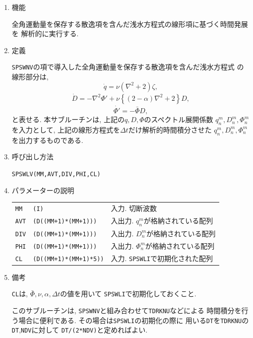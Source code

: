 \documentclass[a4j,fleqn]{jarticle}
\begin{document}
\begin{enumerate}

\item 機能

全角運動量を保存する散逸項を含んだ浅水方程式の線形項に基づく時間発展を
解析的に実行する.

\item 定義

{\tt SPSWNV}の項で導入した全角運動量を保存する散逸項を含んだ浅水方程式
の線形部分は,
\begin{equation}
\dot{q}=\nu(\nabla^2+2)\zeta,
\end{equation}
\begin{eqnarray}
\dot{D}=-\nabla^2\Phi'+\nu\left\{(2-\alpha)\nabla^2+2\right\}D,
\end{eqnarray}
\begin{equation}
\dot{\Phi'}=-\bar\Phi D,
\end{equation}
と表せる.
本サブルーチンは, 上記の$q,D,\Phi$のスペクトル展開係数
$q^m_n,D^m_n,\Phi^m_n$を入力として,
上記の線形方程式を$\Delta t$だけ解析的時間積分させた
$q^m_n,D^m_n,\Phi^m_n$を出力するものである.

\item 呼び出し方法 

{\tt SPSWLV(MM,AVT,DIV,PHI,CL)}

\item パラメーターの説明

\begin{tabular}{lll}
{\tt MM} & {\tt (I)} & 入力. 切断波数\\
{\tt AVT} & {\tt (D((MM+1)*(MM+1)))} 
& 入出力. $q^m_n$が格納されている配列\\
{\tt DIV} & {\tt (D((MM+1)*(MM+1)))} 
& 入出力. $D^m_n$が格納されている配列\\
{\tt PHI} & {\tt (D((MM+1)*(MM+1)))} 
& 入出力. $\Phi^m_n$が格納されている配列\\
{\tt CL}  & {\tt (D((MM+1)*(MM+1)*5))}
             & 入力. {\tt SPSWLI}で初期化された配列
\end{tabular}

\item 備考

{\tt CL}は, $\bar\Phi,\nu,\alpha,\Delta t$の値を用いて
{\tt SPSWLI}で初期化しておくこと.

このサブルーチンは, {\tt SPSWNV}と組み合わせて{\tt TDRKNU}などによる
時間積分を行う場合に便利である. その場合は{\tt SPSWLI}の初期化の際に
用いる{\tt DT}を{\tt TDRKNU}の{\tt DT},{\tt NDV}に対して
{\tt DT/(2*NDV)}と定めればよい.

\end{enumerate}
\end{document}
